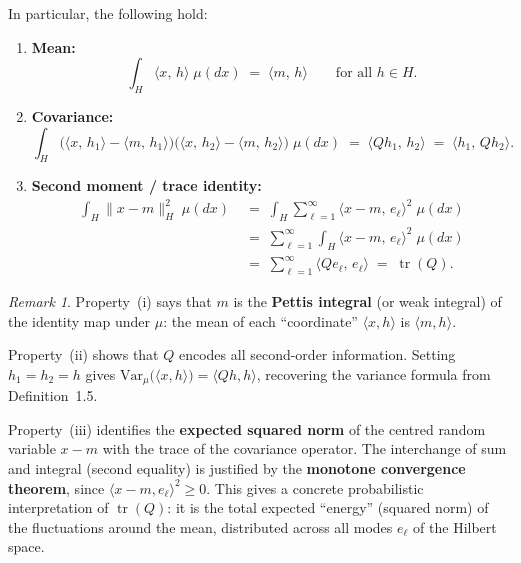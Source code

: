\documentclass[11pt]{article}
\theoremstyle{definition}
\theoremstyle{remark}
\newtheorem{remark}{Remark}
\DeclareMathOperator{\tr}{tr}
\begin{document}
In particular, the following hold:
\begin{enumerate}
    \item[\textup{(i)}]
    \textbf{Mean:}
    \[
        \int_H \langle x,\, h \rangle\;\mu(dx)
        \;=\;
        \langle m,\, h \rangle
        \qquad \text{for all } h \in H.
    \]

    \item[\textup{(ii)}]
    \textbf{Covariance:}
    \[
        \int_H
        \bigl(\langle x,\, h_1 \rangle - \langle m,\, h_1 \rangle\bigr)
        \bigl(\langle x,\, h_2 \rangle - \langle m,\, h_2 \rangle\bigr)
        \;\mu(dx)
        \;=\;
        \langle Q h_1,\, h_2 \rangle
        \;=\;
        \langle h_1,\, Q h_2 \rangle.
    \]

    \item[\textup{(iii)}]
    \textbf{Second moment / trace identity:}
    \begin{align*}
        \int_H \|x - m\|_H^2\;\mu(dx)
        &\;=\;
        \int_H \sum_{\ell=1}^{\infty}
        \langle x - m,\, e_\ell \rangle^2\;\mu(dx) \\[6pt]
        &\;=\;
        \sum_{\ell=1}^{\infty}
        \int_H \langle x - m,\, e_\ell \rangle^2\;\mu(dx) \\[6pt]
        &\;=\;
        \sum_{\ell=1}^{\infty}
        \langle Q e_\ell,\, e_\ell \rangle
        \;=\;
        \tr(Q).
    \end{align*}
\end{enumerate}

\begin{remark}
Property~(i) says that $m$ is the \textbf{Pettis integral}
(or weak integral) of the identity map under $\mu$: the mean
of each ``coordinate'' $\langle x, h\rangle$ is $\langle m, h\rangle$.

Property~(ii) shows that $Q$ encodes all second-order information.
Setting $h_1 = h_2 = h$ gives
$\mathrm{Var}_\mu\!\bigl(\langle x, h\rangle\bigr) = \langle Qh, h\rangle$,
recovering the variance formula from Definition~1.5.

Property~(iii) identifies the \textbf{expected squared norm} of the
centred random variable $x - m$ with the trace of the covariance
operator.  The interchange of sum and integral (second equality)
is justified by the \textbf{monotone convergence theorem},
since $\langle x - m, e_\ell\rangle^2 \ge 0$.
This gives a concrete probabilistic interpretation of $\tr(Q)$:
it is the total expected ``energy'' (squared norm) of the fluctuations
around the mean, distributed across all modes $e_\ell$ of the
Hilbert space.
\end{remark}
\end{document}
